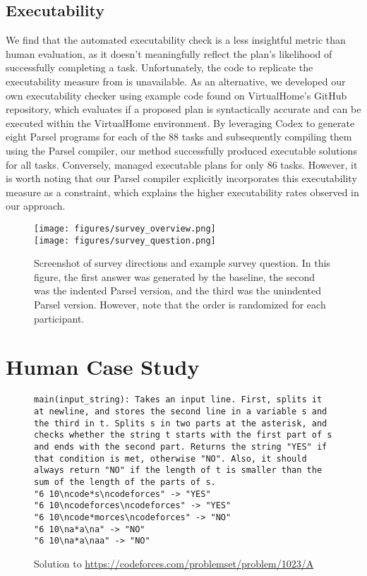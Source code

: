 \subsection{Executability}
We find that the automated executability check is a less insightful metric than human evaluation, as it doesn't meaningfully reflect the plan's likelihood of successfully completing a task. Unfortunately, the code to replicate the executability measure from \citet{huang2022language} is unavailable. As an alternative, we developed our own executability checker using example code found on VirtualHome's GitHub repository, which evaluates if a proposed plan is syntactically accurate and can be executed within the VirtualHome environment. By leveraging Codex to generate eight Parsel programs for each of the 88 tasks and subsequently compiling them using the Parsel compiler, our method successfully produced executable solutions for all tasks. Conversely, \citet{huang2022language} managed executable plans for only 86 tasks. However, it is worth noting that our Parsel compiler explicitly incorporates this executability measure as a constraint, which explains the higher executability rates observed in our approach.

\begin{figure*}[h] 
\centering
\texttt{[image: figures/survey\_overview.png]}\\
\texttt{[image: figures/survey\_question.png]}
\caption{Screenshot of survey directions and example survey question. In this figure, the first  answer was generated by the baseline, the second was the indented Parsel version, and the third was the unindented Parsel version. However, note that the order is randomized for each participant. \label{survey}}
\end{figure*}

\clearpage
\newpage
\section{Human Case Study}
\label{humannofone}
\begin{figure*}[h]
\begin{lstlisting}
main(input_string): Takes an input line. First, splits it at newline, and stores the second line in a variable s and the third in t. Splits s in two parts at the asterisk, and checks whether the string t starts with the first part of s and ends with the second part. Returns the string "YES" if that condition is met, otherwise "NO". Also, it should always return "NO" if the length of t is smaller than the sum of the length of the parts of s.
"6 10\ncode*s\ncodeforces" -> "YES"
"6 10\ncodeforces\ncodeforces" -> "YES"
"6 10\ncode*morces\ncodeforces" -> "NO"
"6 10\na*a\na" -> "NO"
"6 10\na*a\naa" -> "NO"
\end{lstlisting}
\caption{Solution to \url{https://codeforces.com/problemset/problem/1023/A}}
\end{figure*}

